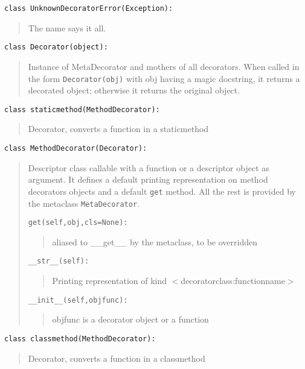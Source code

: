 \documentclass[11pt,english]{article}
\begin{document}
\texttt{class UnknownDecoratorError(Exception):}
\begin{quote}

The name says it all.
\end{quote}

\texttt{class Decorator(object):}
\begin{quote}

Instance of MetaDecorator and mothers of all decorators. When called
in the form \texttt{Decorator(obj)} with obj having a magic docstring, it returns
a decorated object; otherwise it returns the original object.
\end{quote}

\texttt{class staticmethod(MethodDecorator):}
\begin{quote}

Decorator, converts a function in a staticmethod
\end{quote}

\texttt{class MethodDecorator(Decorator):}
\begin{quote}

Descriptor class callable with a function or a descriptor object
as argument. It defines a default printing representation on method
decorators objects and a default \texttt{get}  method. All the rest is
provided by the metaclass \texttt{MetaDecorator}.

\texttt{get(self,obj,cls=None):}
\begin{quote}

aliased to {\_}{\_}get{\_}{\_} by the metaclass, to be overridden
\end{quote}

\texttt{{\_}{\_}str{\_}{\_}(self):}
\begin{quote}

Printing representation of kind {$<$}decoratorclass:functionname{$>$}
\end{quote}

\texttt{{\_}{\_}init{\_}{\_}(self,objfunc):}
\begin{quote}

objfunc is a decorator object or a function
\end{quote}
\end{quote}

\texttt{class classmethod(MethodDecorator):}
\begin{quote}

Decorator, converts a function in a classmethod
\end{quote}
\end{document}
